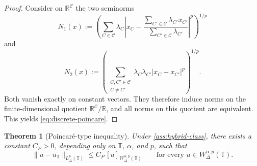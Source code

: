 \documentclass[11pt,a4paper]{article}
\numberwithin{equation}{section}
\newtheorem{theorem}{Theorem}[section]
\theoremstyle{definition}
\newcommand{\T}{\mathbb{T}}
\begin{document}
\begin{proof}
Consider on $\mathbb R^{\mathcal C}$ the two seminorms
\[
N_1(x):=\left(\sum_{C\in\mathcal C}\lambda_C\left|x_C-\frac{\sum_{C'\in\mathcal C}\lambda_{C'}x_{C'}}{\sum_{C'\in\mathcal C}\lambda_{C'}}\right|^p\right)^{1/p}
\]
and
\[
N_2(x):=\left(\sum_{\substack{C,C'\in\mathcal C\\ C\neq C'}}\lambda_C\lambda_{C'}|x_C-x_{C'}|^p\right)^{1/p}.
\]
Both vanish exactly on constant vectors. They therefore induce norms on the finite-dimensional quotient $\mathbb R^{\mathcal C}/\mathbb R$, and all norms on this quotient are equivalent. This yields \eqref{eq:discrete-poincare}.
\end{proof}

\begin{theorem}[Poincar\'e-type inequality]\label{thm:poincare}
Under \cref{ass:hybrid-class}, there exists a constant $C_P>0$, depending
only on $\T$, $\alpha$, and $p$, such that
\begin{equation}\label{eq:poincare-main}
\|u-u_{\T}\|_{L^p_{\Delta}(\T)}
\le
C_P\,[u]_{W^{\alpha,p}_{\Delta}(\T)}
\qquad
\text{for every }u\in W^{\alpha,p}_{\Delta}(\T).
\end{equation}
\end{theorem}
\end{document}
